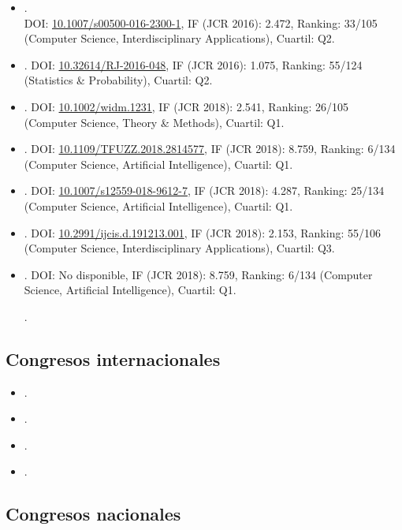 \documentclass[c5paper,10pt,twoside]{book}	   	%
\newcommand{\doi}[1]{\href{https://doi.org/#1}{#1}}
\begin{document}
	\begin{itemize}
		\item {}. \\DOI: \doi{10.1007/s00500-016-2300-1}, IF (JCR 2016): 2.472, Ranking: 33/105 (Computer Science, Interdisciplinary Applications), Cuartil: Q2.
		
		\item {}. DOI: \doi{10.32614/RJ-2016-048}, IF (JCR 2016): 1.075, Ranking: 55/124 (Statistics \& Probability), Cuartil: Q2.
		
		\item {}. DOI: \doi{10.1002/widm.1231}, IF (JCR 2018): 2.541, Ranking: 26/105 (Computer Science, Theory \& Methods), Cuartil: Q1.
		
		\item \sloppy {}.  DOI: \doi{10.1109/TFUZZ.2018.2814577}, IF (JCR 2018): 8.759, Ranking: 6/134 (Computer Science, Artificial Intelligence), Cuartil: Q1.
		
		\item {}. DOI: \doi{10.1007/s12559-018-9612-7}, IF (JCR 2018): 4.287, Ranking: 25/134 (Computer Science, Artificial Intelligence), Cuartil: Q1.
		
		\item {}. DOI: \doi{10.2991/ijcis.d.191213.001}, IF (JCR 2018): 2.153, Ranking: 55/106 (Computer Science, Interdisciplinary Applications), Cuartil: Q3.
		
\item {}.   DOI: No disponible, IF (JCR 2018): 8.759, Ranking: 6/134 (Computer Science, Artificial Intelligence), Cuartil: Q1.
		
.
	\end{itemize}

\subsection{Congresos internacionales}
	
	\begin{itemize}
		\item {}.
		\item {}.
		\item {}.
		\item {}.
	\end{itemize}
	
\subsection{Congresos nacionales}
	
\end{document}
